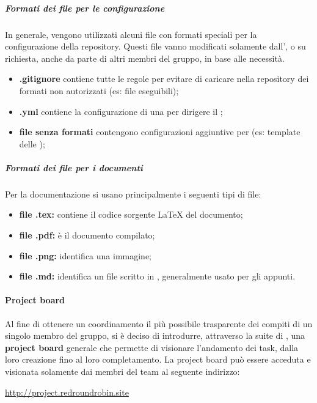 		\subparagraph{Formati dei file per le configurazione}

		In generale, vengono utilizzati alcuni file con formati speciali per la configurazione della repository. Questi file vanno modificati solamente dall', o su richiesta, anche da parte di altri membri del gruppo, in base alle necessità.
		\begin{itemize}
			\item \textbf{.gitignore} contiene tutte le regole per evitare di caricare nella repository dei formati non autorizzati (es: file eseguibili);
			\item \textbf{.yml} contiene la configurazione di una  per dirigere il ;
			\item \textbf{file senza formati} contengono configurazioni aggiuntive per  (es: template delle );
		\end{itemize}

		\subparagraph{Formati dei file per i documenti}

		Per la documentazione si usano principalmente i seguenti tipi di file:
		\begin{itemize}
			\item \textbf{file .tex:} contiene il codice sorgente \LaTeX{} del documento;
			\item \textbf{file .pdf:} è il documento compilato;
			\item \textbf{file .png:} identifica una immagine;
			\item \textbf{file .md:} identifica un file scritto in , generalmente usato per gli appunti.
		\end{itemize}


	\paragraph{Project board}

	Al fine di ottenere un coordinamento il più possibile trasparente dei compiti di un singolo membro del gruppo, si è deciso di introdurre, attraverso la suite di , una \textbf{project board} generale che permette di visionare l'andamento dei task, dalla loro creazione fino al loro completamento.
	La project board può essere acceduta e visionata solamente dai membri del team al seguente indirizzo:

	\href{http://project.redroundrobin.site}{http://project.redroundrobin.site}



